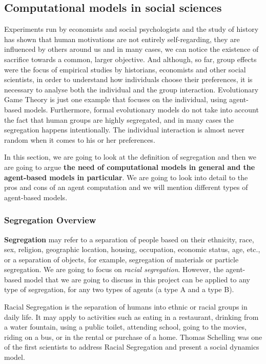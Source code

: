 \documentclass[../main.tex]{subfiles}
\begin{document}
\subsection{Computational models in social sciences}
Experiments run by economists and social psychologists and the study of history has shown that human motivations are not entirely self-regarding, they are influenced by others around us and in many cases, we can notice the existence of sacrifice towards a common, larger objective. And although, so far, group effects were the focus of empirical studies by historians, economists and other social scientists, in order to understand how individuals choose their preferences, it is necessary to analyse both the individual and the group interaction. Evolutionary Game Theory is just one example that focuses on the individual, using agent-based models. Furthermore, formal evolutionary models do not take into account the fact that human groups are highly segregated, and in many cases the segregation happens intentionally. The individual interaction is almost never random when it comes to his or her preferences. 

In this section, we are going to look at the definition of segregation and then we are going to argue \textbf{the need of computational models in general and the agent-based models in particular}. We are going to look into detail to the pros and cons of an agent computation and we will mention different types of agent-based models.


\subsubsection{Segregation Overview}
\textbf{Segregation} may refer to a separation of people based on their ethnicity, race, sex, religion, geographic location, housing, occupation, economic status, age, etc., or a separation of objects, for example, segregation of materials or particle segregation. We are going to focus on \textit{racial segregation}. However, the agent-based model that we are going to discuss in this project can be applied to any type of segregation, for any two types of agents (a type A and a type B).

Racial Segregation is the separation of humans into ethnic or racial groups in daily life. It may apply to activities such as eating in a restaurant, drinking from a water fountain, using a public toilet, attending school, going to the movies, riding on a bus, or in the rental or purchase of a home\cite[]{segregation}. Thomas Schelling was one of the first scientists to address Racial Segregation and present a social dynamics model.
\end{document}
